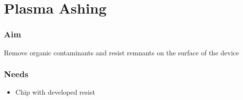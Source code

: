 \documentclass[12pt,a4paper]{report}
\begin{document}
\section{ Plasma Ashing}
\subsubsection{Aim}
Remove organic contaminants and resist remnants on the surface of the device

\subsubsection{Needs}
\begin{itemize}[noitemsep]
  \item Chip with developed resist
\end{itemize}
\end{document}
